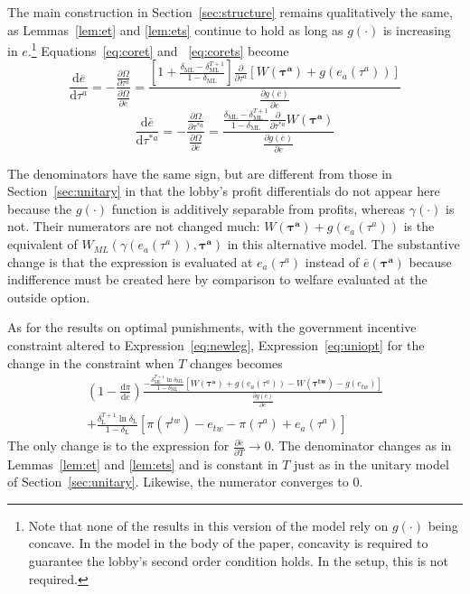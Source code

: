 \documentclass[authoryear, review]{elsarticle}
\newcommand{\ov}{\overline}
\newcommand{\bta}{\bm{\tau^a}}
\newcommand{\ga}{\gamma}
\newcommand{\btw}{\bm{\tau^{tw}}}
\newcommand{\de}{\delta}
\begin{document}
The main construction in Section~\ref{sec:structure} remains qualitatively the same, as Lemmas~\ref{lem:et} and \ref{lem:ets} continue to hold as long as $g(\cdot)$ is increasing in $e$.\footnote{Note that none of the results in this version of the model rely on $g(\cdot)$ being concave. In the model in the body of the paper, concavity is required to guarantee the lobby's second order condition holds. In the \citet{dgh97} setup, this is not required.} Equations~\ref{eq:coret} and ~\ref{eq:corets} become
	\begin{equation*}
		\frac{\mathrm{d} \ov{e}}{\mathrm{d} \tau^a} = -\frac{\frac{\partial \Omega}{\partial \tau^a}}{\frac{\partial \Omega}{\partial \ov{e}}} =
	\textstyle \frac{\left[1+ \frac{\de_\text{ML} - \de_\text{ML}^{T+1}}{1-\de_\text{ML}}  \right]\frac{\partial}{\partial \tau^a}\left[W(\bta) + g(e_a(\tau^a))\right]}{\frac{\partial g(\ov{e})}{\partial e} }
  \end{equation*}
	\begin{equation*}
		\frac{\mathrm{d} \ov{e}}{\mathrm{d} \tau^{*a}} = -\frac{\frac{\partial \Omega}{\partial \tau^{*a}}}{\frac{\partial \Omega}{\partial \ov{e}}} =
	\textstyle \frac{\frac{\de_\text{ML} - \de_\text{ML}^{T+1}}{1-\de_\text{ML}}  \frac{\partial}{\partial \tau^{*a}}W(\bta)}{\frac{\partial g(\ov{e})}{\partial e} }
	\end{equation*}
							
The denominators have the same sign, but are different from those in Section~\ref{sec:unitary} in that the lobby's profit differentials do not appear here because the $g(\cdot)$ function is additively separable from profits, whereas $\ga(\cdot)$ is not. Their numerators are not changed much: $W(\bta) + g(e_a(\tau^a))$ is the equivalent of $W_{ML}(\ga(e_a(\tau^a)),\bta)$ in this alternative model. The substantive change is that the expression is evaluated at $e_a(\tau^a)$ instead of $\ov{e}(\bta)$ because indifference must be created here by comparison to welfare evaluated at the outside option. 

As for the results on optimal punishments, with the government incentive constraint altered to Expression~\ref{eq:newleg}, Expression~\ref{eq:uniopt} for the change in the constraint when $T$ changes becomes 
	\begin{multline}
		\left(1 - \frac{\mathrm{d} \pi}{\mathrm{d} \ov{e}} \right) \frac{ -\frac{\de_\text{ML}^{T+1}\ln\de_\text{ML}}{1-\de_\text{ML}}\left[  W(\bta) +g(e_a(\tau^a)) - W(\btw) - g(e_{tw}) \right]}{ \frac{\partial g(\ov{e})}{\partial e} } \\
	+  \frac{\de_\text{L}^{T+1} \ln \de_\text{L}}{1-\de_\text{L}} \left[ \pi(\tau^{tw}) - e_{tw} -\pi(\tau^a) + e_a(\tau^a) \right]
	\end{multline}
The only change is to the expression for $\frac{\partial \ov{e}}{\partial T} \rightarrow 0$. The denominator changes as in Lemmas~\ref{lem:et} and \ref{lem:ets} and is constant in $T$ just as in the unitary model of Section~\ref{sec:unitary}. Likewise, the numerator converges to $0$.
\end{document}
